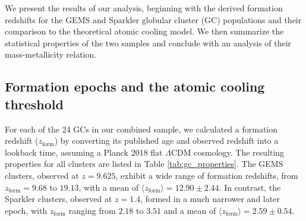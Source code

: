 \documentclass[]{article}
\begin{document}
We present the results of our analysis, beginning with the derived formation redshifts for the GEMS and Sparkler globular cluster (GC) populations and their comparison to the theoretical atomic cooling model. We then summarize the statistical properties of the two samples and conclude with an analysis of their mass-metallicity relation.

\subsection{Formation epochs and the atomic cooling threshold}

For each of the 24 GCs in our combined sample, we calculated a formation redshift ($z_\mathrm{form}$) by converting its published age and observed redshift into a lookback time, assuming a Planck 2018 flat $\Lambda$CDM cosmology. The resulting properties for all clusters are listed in Table \ref{tab:gc_properties}. The GEMS clusters, observed at $z=9.625$, exhibit a wide range of formation redshifts, from $z_\mathrm{form} = 9.68$ to $19.13$, with a mean of $\langle z_\mathrm{form} \rangle = 12.90 \pm 2.44$. In contrast, the Sparkler clusters, observed at $z=1.4$, formed in a much narrower and later epoch, with $z_\mathrm{form}$ ranging from $2.18$ to $3.51$ and a mean of $\langle z_\mathrm{form} \rangle = 2.59 \pm 0.54$.
\end{document}
